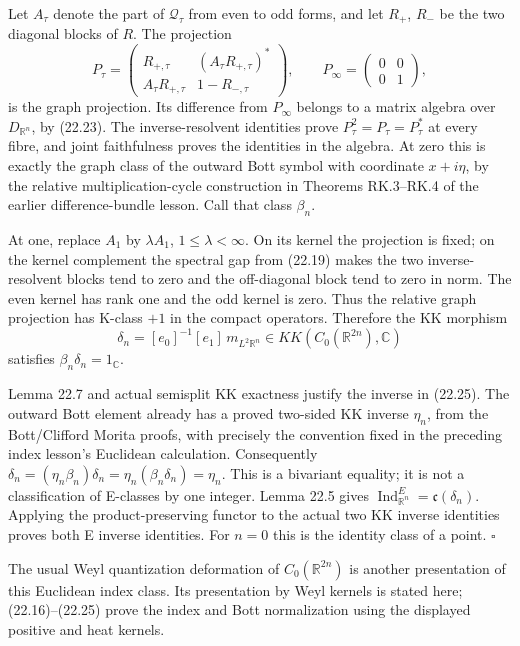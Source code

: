 \documentclass[
  11pt,
]{article}
\begin{document}
Let \(A_\tau\) denote the part of \(\mathcal Q_\tau\) from even to odd
forms, and let \(R_+\), \(R_-\) be the two diagonal blocks of \(R\). The
projection \[
P_\tau=
\begin{pmatrix}
R_{+,\tau}&(A_\tau R_{+,\tau})^*\\
A_\tau R_{+,\tau}&1-R_{-,\tau}
\end{pmatrix},
\qquad P_\infty=\begin{pmatrix}0&0\\0&1\end{pmatrix},
\tag{22.24}
\] is the graph projection. Its difference from \(P_\infty\) belongs to
a matrix algebra over \(D_{\mathbb R^n}\), by (22.23). The
inverse-resolvent identities prove \(P_\tau^2=P_\tau=P_\tau^*\) at every
fibre, and joint faithfulness proves the identities in the algebra. At
zero this is exactly the graph class of the outward Bott symbol with
coordinate \(x+i\eta\), by the relative multiplication-cycle
construction in Theorems RK.3--RK.4 of the earlier difference-bundle
lesson. Call that class \(\beta_n\).

At one, replace \(A_1\) by \(\lambda A_1\), \(1\leq\lambda<\infty\). On
its kernel the projection is fixed; on the kernel complement the
spectral gap from (22.19) makes the two inverse-resolvent blocks tend to
zero and the off-diagonal block tend to zero in norm. The even kernel
has rank one and the odd kernel is zero. Thus the relative graph
projection has K-class \(+1\) in the compact operators. Therefore the KK
morphism \[
\delta_n=[e_0]^{-1}[e_1]\,m_{L^2\mathbb R^n}
\in KK(C_0(\mathbb R^{2n}),\mathbb C)
\tag{22.25}
\] satisfies \(\beta_n\delta_n=1_{\mathbb C}\).

Lemma 22.7 and actual semisplit KK exactness justify the inverse in
(22.25). The outward Bott element already has a proved two-sided KK
inverse \(\eta_n\), from the Bott/Clifford Morita proofs, with precisely
the convention fixed in the preceding index lesson's Euclidean
calculation. Consequently
\(\delta_n=(\eta_n\beta_n)\delta_n=\eta_n(\beta_n\delta_n)=\eta_n\).
This is a bivariant equality; it is not a classification of E-classes by
one integer. Lemma 22.5 gives
\(\operatorname{Ind}^E_{\mathbb R^n}=\mathfrak c(\delta_n)\). Applying
the product-preserving functor to the actual two KK inverse identities
proves both E inverse identities. For \(n=0\) this is the identity class
of a point. \(\square\)

The usual Weyl quantization deformation of \(C_0(\mathbb R^{2n})\) is
another presentation of this Euclidean index class. Its presentation by
Weyl kernels is stated here; (22.16)--(22.25) prove the index and Bott
normalization using the displayed positive and heat kernels.
\end{document}
